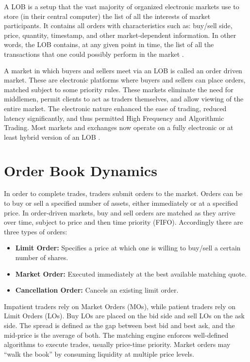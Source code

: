 A LOB is a setup that the vast majority of organized electronic markets use to store (in their central computer) the list of all the interests of market participants. It contains all orders with characteristics such as: buy/sell side, price, quantity, timestamp, and other market-dependent information. In other words, the LOB contains, at any given point in time, the list of all the transactions that one could possibly perform in the market
\cite{Abergel2016}.

A market in which buyers and sellers meet via an LOB is called an order driven market. These are electronic platforms where buyers and sellers can place orders, matched subject to some priority rules. These markets eliminate the need for middlemen, permit clients to act as traders themselves, and allow viewing of the entire market. The electronic nature enhanced the ease of trading, reduced latency significantly, and thus permitted High Frequency and Algorithmic Trading. Most markets and exchanges now operate on a fully electronic or at least hybrid version of an LOB
\cite{Abergel2016, Biais1995}.

\section{Order Book Dynamics}
In order to complete trades, traders submit orders to the market. Orders can be to buy or sell a specified number of assets, either immediately or at a specified price. In order-driven markets, buy and sell orders are matched as they arrive over time, subject to price and then time priority (FIFO). Accordingly there are three types of orders:
\begin{itemize}
    \item \textbf{Limit Order:} Specifies a price at which one is willing to buy/sell a certain number of shares.
    \item \textbf{Market Order:} Executed immediately at the best available matching quote.
    \item \textbf{Cancellation Order:} Cancels an existing limit order.
\end{itemize}

Impatient traders rely on Market Orders (MOs), while patient traders rely on Limit Orders (LOs). Buy LOs are placed on the bid side and sell LOs on the ask side. The spread is defined as the gap between best bid and best ask, and the mid-price is the average of both. The matching engine enforces well-defined algorithms to execute trades, usually price-time priority. Market orders may ``walk the book'' by consuming liquidity at multiple price levels.


